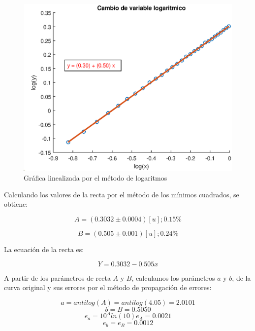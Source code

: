 \documentclass[letter,11pt]{article}
\begin{document}
\begin{figure}[!h]
\centering
\includegraphics[scale=1.00]{eps/3.4.2.eps}
\caption{Gráfica linealizada por el método de logaritmos}
\label{practica44_2}
\end{figure}

Calculando los valores de la recta por el método de los mínimos cuadrados, se
obtiene:

\begin{equation}
    A = (0.3032 \pm 0.0004)[u];0.15\%
\end{equation}

\begin{equation}
    B = (0.505 \pm 0.001)[u];0.24\%
\end{equation}

La ecuación de la recta es:

\begin{equation}
    Y = 0.3032 - 0.505 x
\end{equation}

A partir de los parámetros de recta $A$ y $B$, calculamos los parámetros $a$ y
$b$, de la curva original y sus errores por el método de propagación de errores:

\begin{equation*}
    a = antilog(A) = antilog(4.05) = 2.0101
\end{equation*}
\begin{equation*}
    b = B = 0.5050
\end{equation*}
\begin{equation*}
    e_a = 10^A ln(10) e_A = 0.0021
\end{equation*}
\begin{equation*}
    e_b = e_B = 0.0012
\end{equation*}
\end{document}

